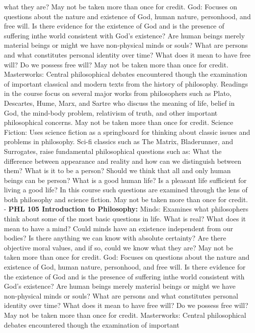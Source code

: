 \documentclass[
  letterpaper,
]{scrbook}
\begin{document}
what they are? May not be taken more than once for credit. God: Focuses
on questions about the nature and existence of God, human nature,
personhood, and free will. Is there evidence for the existence of God
and is the presence of suffering inthe world consistent with God's
existence? Are human beings merely material beings or might we have
non-physical minds or souls? What are persons and what constitutes
personal identity over time? What does it mean to have free will? Do we
possess free will? May not be taken more than once for credit.
Masterworks: Central philosophical debates encountered though the
examination of important classical and modern texts from the history of
philosophy. Readings in the course focus on several major works from
philosophers such as Plato, Descartes, Hume, Marx, and Sartre who
discuss the meaning of life, belief in God, the mind-body problem,
relativism of truth, and other important philosophical concerns. May not
be taken more than once for credit. Science Fiction: Uses science
fiction as a springboard for thinking about classic issues and problems
in philosophy. Sci-fi classics such as The Matrix, Bladerunner, and
Surrogates, raise fundamental philosophical questions such as: What the
difference between appearance and reality and how can we distinguish
between them? What is it to be a person? Should we think that all and
only human beings can be person? What is a good human life? Is a
pleasant life sufficient for living a good life? In this course such
questions are examined through the lens of both philosophy and science
fiction. May not be taken more than once for credit. - \textbf{PHL 105
Introduction to Philosophy:} Minds: Examines what philosophers think
about some of the most basic questions in life. What is real? What does
it mean to have a mind? Could minds have an existence independent from
our bodies? Is there anything we can know with absolute certainty? Are
there objective moral values, and if so, could we know what they are?
May not be taken more than once for credit. God: Focuses on questions
about the nature and existence of God, human nature, personhood, and
free will. Is there evidence for the existence of God and is the
presence of suffering inthe world consistent with God's existence? Are
human beings merely material beings or might we have non-physical minds
or souls? What are persons and what constitutes personal identity over
time? What does it mean to have free will? Do we possess free will? May
not be taken more than once for credit. Masterworks: Central
philosophical debates encountered though the examination of important
\end{document}
